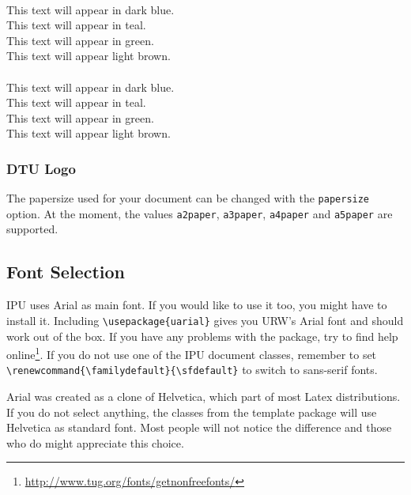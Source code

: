 \documentclass[short,comm,dots]{ipureport}
\begin{document}
~\\
{\color[rgb]{0.03707688311079281, 0.1575158489133046, 0.3665349648484976} This text will appear in dark blue.} \\
{\color[rgb]{0.0, 0.45177932391406056, 0.42070350628569453} This text will appear in teal.} \\
{\color[rgb]{0.10636981679961377, 0.7030871213847766, 0.22340721209323416} This text will appear in green.} \\
{\color[rgb]{0.6282884950424713, 0.7739775224607538, 0.24559323885034906} This text will appear light brown.} \\

~\\
{\color{ipuviridis1} This text will appear in dark blue.} \\
{\color{ipuviridis2} This text will appear in teal.} \\
{\color{ipuviridis3} This text will appear in green.} \\
{\color{ipuviridis4} This text will appear light brown.} \\


\subsubsection{DTU Logo}


The papersize used for your document can be changed with the \texttt{papersize} option. At the moment, the values \texttt{a2paper}, \texttt{a3paper}, \texttt{a4paper} and \texttt{a5paper} are supported. 

\subsection{Font Selection}
IPU uses Arial as main font. If you would like to use it too, you might have to install it. Including \texttt{\textbackslash{}usepackage\{uarial\}} gives you URW's Arial font and should work out of the box. If you have any problems with the package, try to find help online\footnote{\url{http://www.tug.org/fonts/getnonfreefonts/}}. If you do not use one of the IPU document classes, remember to set \texttt{\textbackslash{}renewcommand\{\textbackslash{}familydefault\}\{\textbackslash{}sfdefault\}} to switch to sans-serif fonts. 

Arial was created as a clone of Helvetica, which part of most Latex distributions. If you do not select anything, the classes from the template package will use Helvetica as standard font. Most people will not notice the difference and those who do might appreciate this choice. 
\end{document}

